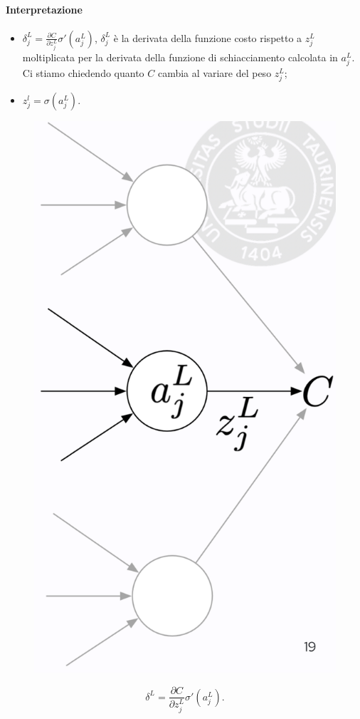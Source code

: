 \paragraph{Interpretazione}
\begin{itemize}
    \item $\delta^L_j=\frac{\partial C}{\partial z^L_j}\sigma'(a^L_j)$, $\delta^L_j$ è la derivata della funzione costo rispetto a $z_j^L$ moltiplicata per la derivata della funzione di schiacciamento calcolata in $a^L_j$. Ci stiamo chiedendo quanto $C$ cambia al variare del peso $z^L_j$;
    \item $z_j^l=\sigma(a^L_j)$.
\end{itemize}
\begin{figure}[!h]
    \includegraphics[scale=.25]{images/backpropagation/firstEq.png}
    \centering
\end{figure}
\newpage
\begin{equation}
    \delta^L=\frac{\partial C}{\partial z^L_j}\sigma'(a^L_j).
\end{equation}

